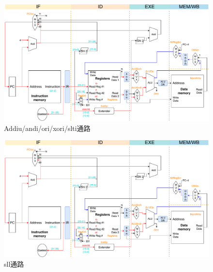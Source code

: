 \begin{figure}[H]
\centering
\includegraphics[width=\linewidth]{fig/Datapath-addi-subi.pdf}
\caption{Addiu/andi/ori/xori/slti通路}
\label{fig:datapath_addi}
\end{figure}
\begin{figure}[H]
\centering
\includegraphics[width=\linewidth]{fig/Datapath-sll.pdf}
\caption{sll通路}
\label{fig:datapath_sll}
\end{figure}

